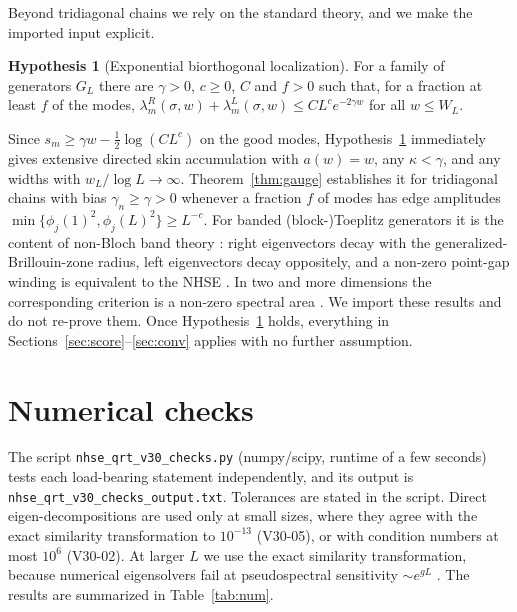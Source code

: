 \documentclass[11pt]{article}
\theoremstyle{definition}
\newtheorem{hypothesis}{Hypothesis}
\theoremstyle{remark}
\begin{document}
Beyond tridiagonal chains we rely on the standard theory, and we make the imported input explicit.

\begin{hypothesis}[Exponential biorthogonal localization]\label{hyp:H}
For a family of generators $G_L$ there are $\gamma>0$, $c\ge0$, $C$ and $f>0$ such that, for a fraction at least $f$ of the modes, $\lambda^R_m(\sigma,w)+\lambda^L_m(\sigma,w)\le CL^ce^{-2\gamma w}$ for all $w\le W_L$.
\end{hypothesis}

Since $s_m\ge\gamma w-\frac12\log(CL^c)$ on the good modes, Hypothesis~\ref{hyp:H} immediately gives extensive directed skin accumulation with $a(w)=w$, any $\kappa<\gamma$, and any widths with $w_L/\log L\to\infty$. Theorem~\ref{thm:gauge} establishes it for tridiagonal chains with bias $\gamma_n\ge\gamma>0$ whenever a fraction $f$ of modes has edge amplitudes $\min\{\phi_j(1)^2,\phi_j(L)^2\}\ge L^{-c}$. For banded (block-)Toeplitz generators it is the content of non-Bloch band theory \cite{YW18,YM19,LT19}: right eigenvectors decay with the generalized-Brillouin-zone radius, left eigenvectors decay oppositely, and a non-zero point-gap winding is equivalent to the NHSE \cite{OKSS20,ZYF20}. In two and more dimensions the corresponding criterion is a non-zero spectral area \cite{ZYF22}. We import these results and do not re-prove them. Once Hypothesis~\ref{hyp:H} holds, everything in Sections~\ref{sec:score}--\ref{sec:conv} applies with no further assumption.

\section{Numerical checks}
\label{sec:num}

The script \texttt{nhse\_qrt\_v30\_checks.py} (numpy/scipy, runtime of a few seconds) tests each load-bearing statement independently, and its output is \texttt{nhse\_qrt\_v30\_checks\_output.txt}. Tolerances are stated in the script. Direct eigen-decompositions are used only at small sizes, where they agree with the exact similarity transformation to $10^{-13}$ (V30-05), or with condition numbers at most $10^6$ (V30-02). At larger $L$ we use the exact similarity transformation, because numerical eigensolvers fail at pseudospectral sensitivity $\sim e^{gL}$ \cite{TE05}. The results are summarized in Table~\ref{tab:num}.
\end{document}
